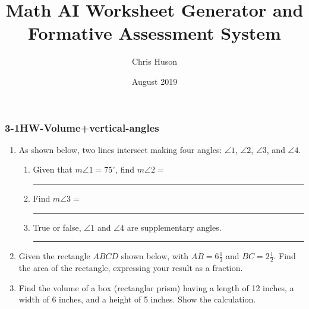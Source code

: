 \documentclass[12pt, twoside]{article}
\title{Math AI Worksheet Generator and Formative Assessment System}
\author{Chris Huson}
\date{August 2019}
\begin{document}
\subsubsection*{3-1HW-Volume+vertical-angles}
\begin{enumerate}
\item As shown below, two lines intersect making four angles: $\angle 1$, $\angle 2$, $\angle 3$, and $\angle 4$.
    \begin{center}
    \end{center}
    \begin{enumerate}
    \item Given that $m\angle 1= 75^\circ$, find $m\angle 2=$ \rule{2.5cm}{0.15mm} \bigskip
    \item Find $m\angle 3=$ \rule{2.5cm}{0.15mm} \bigskip
    \item True or false, $\angle 1$ and $\angle 4$ are supplementary angles. \rule{3cm}{0.15mm}
  \end{enumerate}

\item Given the rectangle $ABCD$ shown below, with $AB=6 \frac{1}{3}$ and $BC=2 \frac{1}{2}$. Find the area of the rectangle, expressing your result as a fraction.
\begin{flushright}
\end{flushright} \vspace{2cm}  

\item Find the volume of a box (rectanglar prism) having a length of 12 inches, a width of 6 inches, and a height of 5 inches. Show the calculation.


\end{enumerate}
\end{document}
